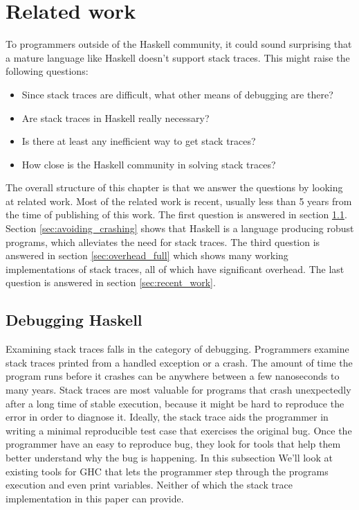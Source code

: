 \chapter{Related work}

To programmers outside of the Haskell community, it could sound
surprising that a mature language like Haskell doesn't support stack
traces. This might raise the following questions:

\begin{itemize}
  \itemsep1pt\parskip0pt
  \item
    Since stack traces are difficult, what other means of debugging are
    there?
  \item
    Are stack traces in Haskell really necessary?
  \item
    Is there at least any inefficient way to get stack traces?
  \item
    How close is the Haskell community in solving stack traces?
\end{itemize}

The overall structure of this chapter is that we answer the questions
by looking at related work. Most of the
related work is recent, usually less than 5 years from the time of
publishing of this work. The first question is answered in section
\ref{sec:debugging_haskell}. Section \ref{sec:avoiding_crashing}
shows that Haskell is a language producing robust programs, which
alleviates the need for stack traces.
The third question is answered in section
\ref{sec:overhead_full} which shows many working implementations of
stack traces, all of which have significant overhead. The last question
is answered in section \ref{sec:recent_work}.

\section{Debugging Haskell} \label{sec:debugging_haskell}

Examining stack traces falls in the category of debugging. Programmers
examine stack traces printed from a handled exception or a
crash. The amount of time the program runs before it crashes can be
anywhere between a few nanoseconds to many years. Stack traces are most
valuable for programs that crash unexpectedly after a long time of
stable execution, because it might be hard to reproduce the error in
order to diagnose it. Ideally, the stack trace aids the programmer in
writing a minimal reproducible test case that exercises the original
bug. Once the programmer have an easy to reproduce bug, they look for
tools that help them better understand why the bug is happening. In this
subsection We'll look at existing tools for GHC that lets the programmer
step through the programs execution and even print variables. Neither of
which the stack trace implementation in this paper can provide.


